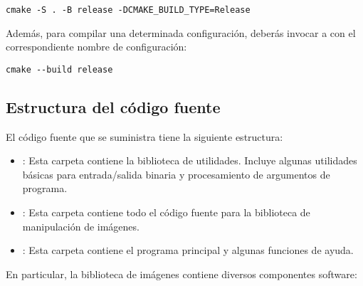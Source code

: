 \begin{lstlisting}[style=terminal,aboveskip=1em,belowskip=1em]
cmake -S . -B release -DCMAKE_BUILD_TYPE=Release
\end{lstlisting}

Además, para compilar una determinada configuración, deberás invocar a 
 con el correspondiente nombre de configuración:

\begin{lstlisting}[style=terminal,aboveskip=1em,belowskip=1em]
cmake --build release
\end{lstlisting}


\subsection{Estructura del código fuente}

El código fuente que se suministra tiene la siguiente estructura:


\begin{itemize}

\item {}: 
Esta carpeta contiene la biblioteca de utilidades. Incluye algunas utilidades
básicas para entrada/salida binaria y procesamiento de argumentos de programa.

\item {}: 
Esta carpeta contiene todo el código fuente para la biblioteca de manipulación
de imágenes.

\item {}: 
Esta carpeta contiene el programa principal y algunas funciones de ayuda.

\end{itemize}

En particular, la biblioteca de imágenes contiene diversos componentes software:


